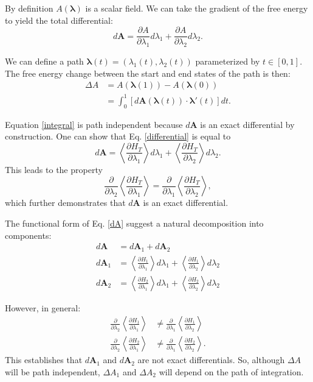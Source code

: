 \documentclass[%
 preprint,
 amsmath,amssymb,
 aps,
]{revtex4-1}
\renewcommand{\vec}[1]{{\bm{#1}}}
\begin{document}
By definition $A(\vec\lambda)$ is a scalar field. We can take the gradient of the free energy to yield the total differential:
\begin{equation}
d\vec A = \frac{\partial A}{\partial \lambda_1} d\lambda_1 + \frac{\partial A}{\partial \lambda_2} d\lambda_2. \label{differential}
\end{equation}

We can define a path $\vec \lambda(t) = \left(\lambda_1(t), \lambda_2(t)\right)$ parameterized by $t \in [0, 1]$. The free energy change between the start and end states of the path is then:
\begin{align}
\Delta A &= A\left(\vec\lambda\left(1\right)\right) -
            A\left(\vec\lambda\left(0\right)\right) \\
         &= \int_0^1 \left[d\vec A\left(\vec\lambda\left(t\right)\right)
         \cdot
         \vec\lambda'\left(t\right)\right] dt. \label{integral}
\end{align}

Equation \ref{integral} is path independent because $d\vec A$ is an exact differential by construction. One can show that Eq. \ref{differential} is equal to
\begin{equation}
d\vec A = \left< \frac{\partial H_T}{\partial \lambda_1} \right> d\lambda_1 +
          \left< \frac{\partial H_T}{\partial \lambda_2} \right> d\lambda_2.\label{dA}
\end{equation}
This leads to the property
\begin{equation}
\frac{\partial}{\partial \lambda_2}\left< \frac{\partial H_T}{\partial \lambda_1} \right>
=
\frac{\partial}{\partial \lambda_1}\left< \frac{\partial H_T}{\partial \lambda_2} \right>,
\end{equation}
which further demonstrates that $d\vec A$ is an exact differential.

The functional form of Eq. \ref{dA} suggest a natural decomposition into components:
\begin{align}
d\vec A &= d\vec A_1 + d\vec A_2 \\
d\vec A_1 &= 
\left< \frac{\partial H_1}{\partial \lambda_1} \right> d\lambda_1 +
\left< \frac{\partial H_1}{\partial \lambda_2} \right> d\lambda_2 \label{dA1}\\
d\vec A_2 &= 
\left< \frac{\partial H_2}{\partial \lambda_1} \right> d\lambda_1 +
\left< \frac{\partial H_2}{\partial \lambda_2} \right> d\lambda_2 \label{dA2}
\end{align}

However, in general:
\begin{align}
\frac{\partial}{\partial \lambda_2}\left<\frac{\partial H_1}{\partial \lambda_1}\right>
&\neq
\frac{\partial}{\partial \lambda_1}\left<\frac{\partial H_1}{\partial \lambda_2}\right>\\
\frac{\partial}{\partial \lambda_2}\left<\frac{\partial H_2}{\partial \lambda_1}\right>
&\neq
\frac{\partial}{\partial \lambda_1}\left<\frac{\partial H_2}{\partial \lambda_2}\right>.
\end{align}
This establishes that $d\vec A_1$ and $d\vec A_2$ are not exact differentials. So, although $\Delta A$ will be path independent, $\Delta A_1$ and $\Delta A_2$ will depend on the path of integration.
\end{document}
